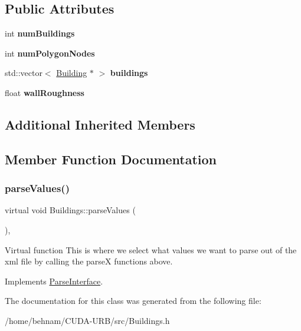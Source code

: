\subsection*{Public Attributes}
\begin{DoxyCompactItemize}
\item 
\mbox{\label{classBuildings_ad813fd3b4a16573db8053b37d5b97bda}} 
int {\bfseries num\+Buildings}
\item 
\mbox{\label{classBuildings_af2ce540b40f5555f705800187e34a8b9}} 
int {\bfseries num\+Polygon\+Nodes}
\item 
\mbox{\label{classBuildings_a50977969dd40837e447d794a2bc07238}} 
std\+::vector$<$ \hyperlink{classBuilding}{Building} $\ast$ $>$ {\bfseries buildings}
\item 
\mbox{\label{classBuildings_a250aa6acd2da48a13193ff4412536115}} 
float {\bfseries wall\+Roughness}
\end{DoxyCompactItemize}
\subsection*{Additional Inherited Members}


\subsection{Member Function Documentation}
\mbox{\label{classBuildings_a97851dd190977ba999ecb1f50481c400}} 
\subsubsection{\texorpdfstring{parse\+Values()}{parseValues()}}
{\footnotesize\ttfamily virtual void Buildings\+::parse\+Values (\begin{DoxyParamCaption}{ }\end{DoxyParamCaption})\hspace{0.3cm}{\ttfamily [inline]}, {\ttfamily [virtual]}}

Virtual function This is where we select what values we want to parse out of the xml file by calling the parseX functions above. 

Implements \hyperlink{classParseInterface_afca32108192ba0997c9e5a78189b0cbc}{Parse\+Interface}.



The documentation for this class was generated from the following file\+:\begin{DoxyCompactItemize}
\item 
/home/behnam/\+C\+U\+D\+A-\/\+U\+R\+B/src/Buildings.\+h\end{DoxyCompactItemize}
